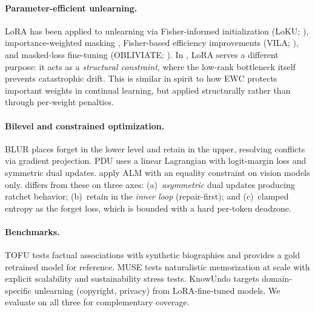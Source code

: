 \paragraph{Parameter-efficient unlearning.}
LoRA \citep{hu2022lora} has been applied to unlearning via Fisher-informed initialization (LoKU; \citealt{cha2025loku}), importance-weighted masking \citep{jia2024wagle}, Fisher-based efficiency improvements (VILA; \citealt{kim2025improving}), and masked-loss fine-tuning (OBLIVIATE; \citealt{xu2025obliviate}).
In \method, LoRA serves a different purpose: it acts as a \emph{structural constraint}, where the low-rank bottleneck itself prevents catastrophic drift.
This is similar in spirit to how EWC \citep{kirkpatrick2017overcoming} protects important weights in continual learning, but applied structurally rather than through per-weight penalties.

\paragraph{Bilevel and constrained optimization.}
BLUR \citep{reisizadeh2026blur} places forget in the lower level and retain in the upper, resolving conflicts via gradient projection.
PDU \citep{entesari2026constrained} uses a linear Lagrangian with logit-margin loss and symmetric dual updates.
\citet{cheng2026unlearning} apply ALM with an equality constraint on vision models only.
\method differs from these on three axes: (a)~\emph{asymmetric} dual updates producing ratchet behavior; (b)~retain in the \emph{inner loop} (repair-first); and (c)~clamped entropy as the forget loss, which is bounded with a hard per-token deadzone.

\paragraph{Benchmarks.}
TOFU \citep{maini2024tofu} tests factual associations with synthetic biographies and provides a gold retrained model for reference.
MUSE \citep{shi2025muse} tests naturalistic memorization at scale with explicit scalability and sustainability stress tests.
KnowUndo \citep{tian2024knowundo} targets domain-specific unlearning (copyright, privacy) from LoRA-fine-tuned models.
We evaluate on all three for complementary coverage.
